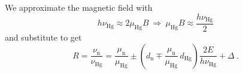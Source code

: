 We approximate the magnetic field with
\begin{equation}
   h \nu_\text{Hg} \approx 2 \mu_\text{Hg} B \ \Rightarrow \ \mu_\text{Hg} B \approx \frac{h \nu_\text{Hg}}{2}
\end{equation}
and substitute to get
\begin{equation}
  R = \frac{\nu_\text{n}}{\nu_\text{Hg}} = \frac{\mu_\text{n}}{\mu_\text{Hg}} \pm \left( d_\text{n} \mp \frac{\mu_\text{n}}{\mu_\text{Hg}} \, d_\text{Hg} \right) \frac{2 E}{ h  \nu_\text{Hg}} + \Delta \ .
\end{equation}
